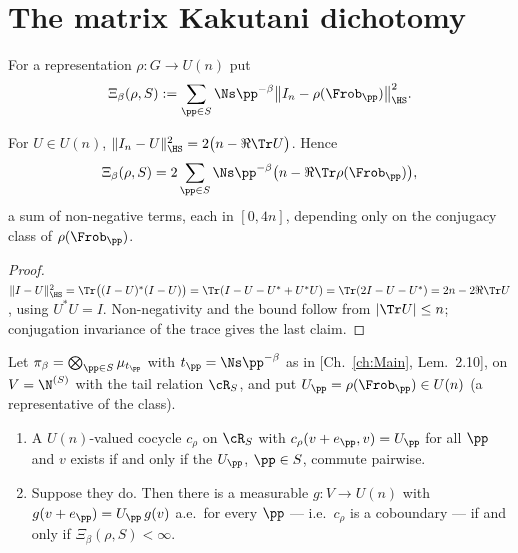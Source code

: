 \section{The matrix Kakutani dichotomy}\label{VI:sec:kakutani}

\begin{definition}\label{VI:def:Xi}
For a representation $\rho:G\to U(n)$ put
\begin{equation}\label{VI:eq:Xi}
\Xi_\beta(\rho,S):=\sum_{\pp\in S}\Ns\pp^{-\beta}\bigl\|I_n-\rho(\Frob_\pp)\bigr\|_{\HS}^2 .
\end{equation}
\end{definition}

\begin{lemma}\label{VI:lem:trace}
For $U\in U(n)$, $\|I_n-U\|_{\HS}^2=2\bigl(n-\Re\Tr U\bigr)$. Hence
\begin{equation}\label{VI:eq:trace}
\Xi_\beta(\rho,S)=2\sum_{\pp\in S}\Ns\pp^{-\beta}\bigl(n-\Re\Tr\rho(\Frob_\pp)\bigr),
\end{equation}
a sum of non-negative terms, each in $[0,4n]$, depending only on the conjugacy class of
$\rho(\Frob_\pp)$.
\end{lemma}

\begin{proof}
$\|I-U\|_{\HS}^2=\Tr\bigl((I-U)^*(I-U)\bigr)=\Tr(I-U-U^*+U^*U)=\Tr(2I-U-U^*)=2n-2\Re\Tr U$,
using $U^*U=I$. Non-negativity and the bound follow from $|\Tr U|\le n$; conjugation
invariance of the trace gives the last claim.
\end{proof}

\begin{theorem}\label{VI:thm:kakutani}
Let $\pi_\beta=\bigotimes_{\pp\in S}\mu_{t_\pp}$ with $t_\pp=\Ns\pp^{-\beta}$ as in
[Ch.~\ref{ch:Main}, Lem.~2.10], on $V=\N^{(S)}$ with the tail relation $\cR_S$, and put
$U_\pp=\rho(\Frob_\pp)\in U(n)$ (a representative of the class).
\begin{enumerate}
\item A $U(n)$-valued cocycle $c_\rho$ on $\cR_S$ with $c_\rho(v+e_\pp,v)=U_\pp$ for all
$\pp$ and $v$ exists if and only if the $U_\pp$, $\pp\in S$, commute pairwise.
\item Suppose they do. Then there is a measurable $g:V\to U(n)$ with
$g(v+e_\pp)=U_\pp\,g(v)$ a.e.\ for every $\pp$ --- i.e.\ $c_\rho$ is a coboundary --- if
and only if $\Xi_\beta(\rho,S)<\infty$.
\end{enumerate}
\end{theorem}

